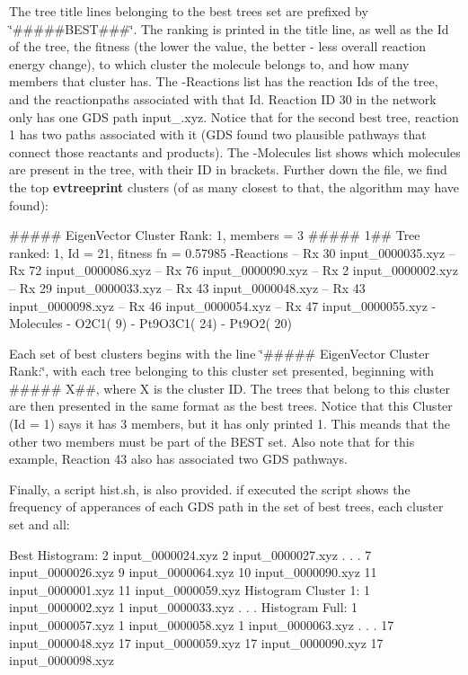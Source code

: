 The tree title lines belonging to the best trees set are prefixed by \char`\"{}\#\#\#\#\#\+B\+E\+S\+T\#\#\#\char`\"{}. The ranking is printed in the title line, as well as the Id of the tree, the fitness (the lower the value, the better -\/ less overall reaction energy change), to which cluster the molecule belongs to, and how many members that cluster has. The -\/\+Reactions list has the reaction Ids of the tree, and the reactionpaths associated with that Id. Reaction ID 30 in the network only has one G\+DS path input\+\_.\+xyz. Notice that for the second best tree, reaction 1 has two paths associated with it (G\+DS found two plausible pathways that connect those reactants and products). The -\/\+Molecules list shows which molecules are present in the tree, with their ID in brackets. Further down the file, we find the top {\bfseries evtreeprint} clusters (of as many closest to that, the algorithm may have found)\+: \begin{DoxyVerb}##### EigenVector Cluster Rank:     1, members =      3
#####    1## Tree ranked:     1, Id =    21, fitness fn =     0.57985
            -Reactions
            -- Rx    30 input_0000035.xyz
            -- Rx    72 input_0000086.xyz
            -- Rx    76 input_0000090.xyz
            -- Rx     2 input_0000002.xyz
            -- Rx    29 input_0000033.xyz
            -- Rx    43 input_0000048.xyz
            -- Rx    43 input_0000098.xyz
            -- Rx    46 input_0000054.xyz
            -- Rx    47 input_0000055.xyz
            -Molecules
            - O2C1(    9)
            - Pt9O3C1(   24)
            - Pt9O2(   20)
\end{DoxyVerb}


Each set of best clusters begins with the line \char`\"{}\#\#\#\#\# Eigen\+Vector Cluster Rank\+:\char`\"{}, with each tree belonging to this cluster set presented, beginning with \textquotesingle{}\#\#\#\#\# X\#\#\textquotesingle{}, where X is the cluster ID. The trees that belong to this cluster are then presented in the same format as the best trees. Notice that this Cluster (Id = 1) says it has 3 members, but it has only printed 1. This meands that the other two members must be part of the B\+E\+ST set. Also note that for this example, Reaction 43 also has associated two G\+DS pathways.

Finally, a script hist.\+sh, is also provided. if executed the script shows the frequency of apperances of each G\+DS path in the set of best trees, each cluster set and all\+: \begin{DoxyVerb}Best Histogram:
      2 input_0000024.xyz
      2 input_0000027.xyz
             .
             .
             .
      7 input_0000026.xyz
      9 input_0000064.xyz
     10 input_0000090.xyz
     11 input_0000001.xyz
     11 input_0000059.xyz
Histogram Cluster 1:
      1 input_0000002.xyz
      1 input_0000033.xyz
             .
             .
             .
Histogram Full: 
      1 input_0000057.xyz
      1 input_0000058.xyz
      1 input_0000063.xyz
             .
             .
             .
     17 input_0000048.xyz
     17 input_0000059.xyz
     17 input_0000090.xyz
     17 input_0000098.xyz
\end{DoxyVerb}


